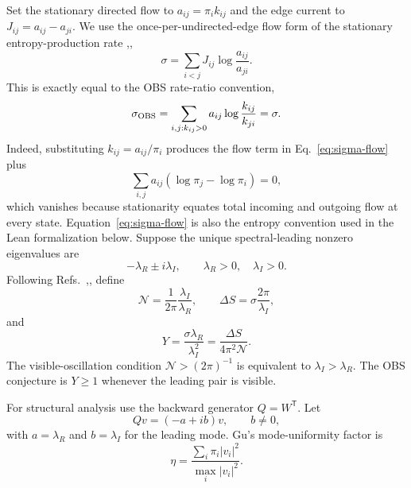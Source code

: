 \documentclass[aps,pre,reprint,groupedaddress,nofootinbib,showkeys,floatfix]{revtex4-2}
\newcommand{\Ncoh}{\mathcal N}
\begin{document}
Set the stationary directed flow to $a_{ij}=\pi_i k_{ij}$ and the edge current to $J_{ij}=a_{ij}-a_{ji}$. We use the once-per-undirected-edge flow form of the stationary entropy-production rate \cite{Schnakenberg1976},\cite{Seifert2012},
\begin{equation}
\sigma=\sum_{i<j}J_{ij}\log\frac{a_{ij}}{a_{ji}}.
\label{eq:sigma-flow}
\end{equation}
This is exactly equal to the OBS rate-ratio convention,
\begin{equation}
\sigma_{\rm OBS}=\sum_{i,j:k_{ij}>0}a_{ij}\log\frac{k_{ij}}{k_{ji}}=\sigma.
\label{eq:sigma-equivalence}
\end{equation}
Indeed, substituting $k_{ij}=a_{ij}/\pi_i$ produces the flow term in Eq.~\eqref{eq:sigma-flow} plus
\begin{equation}
\sum_{i,j}a_{ij}(\log\pi_j-\log\pi_i)=0,
\end{equation}
which vanishes because stationarity equates total incoming and outgoing flow at every state. Equation~\eqref{eq:sigma-flow} is also the entropy convention used in the Lean formalization below.
Suppose the unique spectral-leading nonzero eigenvalues are
\begin{equation}
-\lambda_R\pm i\lambda_I,\qquad \lambda_R>0,\quad\lambda_I>0.
\end{equation}
Following Refs.~\cite{BaratoSeifert2017},\cite{OBS2022}, define
\begin{equation}
\Ncoh=\frac{1}{2\pi}\frac{\lambda_I}{\lambda_R},\qquad
\Delta S=\sigma\frac{2\pi}{\lambda_I},
\end{equation}
and
\begin{equation}
Y=\frac{\sigma\lambda_R}{\lambda_I^2}=\frac{\Delta S}{4\pi^2\Ncoh}.
\end{equation}
The visible-oscillation condition $\Ncoh>(2\pi)^{-1}$ is equivalent to $\lambda_I>\lambda_R$. The OBS conjecture is $Y\ge1$ whenever the leading pair is visible.

For structural analysis use the backward generator $Q=W^{\mathsf T}$. Let
\begin{equation}
Qv=(-a+ib)v,\qquad b\ne0,
\end{equation}
with $a=\lambda_R$ and $b=\lambda_I$ for the leading mode. Gu's mode-uniformity factor is
\begin{equation}
\eta=\frac{\sum_i\pi_i|v_i|^2}{\max_i|v_i|^2}.
\end{equation}
\end{document}
